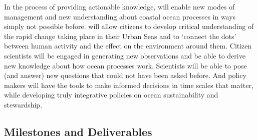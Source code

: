 \documentclass[12pt]{article}
\begin{document}

In the process of providing actionable knowledge, \pro will enable new
modes of management and new understanding about coastal ocean
processes in ways simply not possible before. \pro will allow citizens
to develop critical understanding of the rapid change taking place in
their Urban Seas and to ‘connect the dots’ between human activity and
the effect on the environment around them. Citizen scientists will be
engaged in generating new observations and be able to derive new
knowledge about how ocean processes work. Scientists will be able to
pose (and answer) new questions that could not have been asked
before. And policy makers will have the tools to make informed
decisions in time scales that matter, while developing truly
integrative policies on ocean sustainability and
stewardship. %


\subsection{Milestones and Deliverables}
\end{document}
